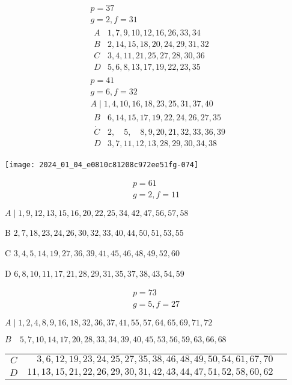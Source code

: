 \documentclass[10pt]{article}
\begin{document}
\[
\begin{aligned}
& p=37 \\
& g=2, f=31 \\
& \begin{array}{c|ccc}
A & 1,7,9,10,12,16,26,33,34 \\
B & 2,14,15,18,20,24,29,31,32 \\
C & 3,4,11,21,25,27,28,30,36 \\
D & 5,6,8,13,17,19,22,23,35
\end{array} \\
& p=41 \\
& g=6, f=32 \\
& A \mid 1,4,10,16,18,23,25,31,37,40 \\
& \begin{array}{r|rrr}
B & 6,14,15,17,19,22,24,26,27,35 \\
\dot{C} & 2, \quad 5, \quad 8,9,20,21,32,33,36,39 \\
D & 3,7,11,12,13,28,29,30,34,38
\end{array}
\end{aligned}
\]

\begin{center}
\texttt{[image: 2024\_01\_04\_e0810c81208c972ee51fg-074]}
\end{center}

\[
\begin{gathered}
p=61 \\
g=2, f=11
\end{gathered}
\]

\(A \mid 1,9,12,13,15,16,20,22,25,34,42,47,56,57,58\)

B \(2,7,18,23,24,26,30,32,33,40,44,50,51,53,55\)

C \(3,4,5,14,19,27,36,39,41,45,46,48,49,52,60\)

D \(6,8,10,11,17,21,28,29,31,35,37,38,43,54,59\)

\[
\begin{gathered}
p=73 \\
g=5, f=27
\end{gathered}
\]

\(A \mid 1,2,4,8,9,16,18,32,36,37,41,55,57,64,65,69,71,72\)

\(B \quad 5,7,10,14,17,20,28,33,34,39,40,45,53,56,59,63,66,68\)

\begin{center}
\begin{tabular}{c|rr}
\(C\) & \(3,6,12,19,23,24,25,27,35,38,46,48,49,50,54,61,67,70\) \\
\(D\) & \(11,13,15,21,22,26,29,30,31,42,43,44,47,51,52,58,60,62\) \\
\end{tabular}
\end{center}
\end{document}
